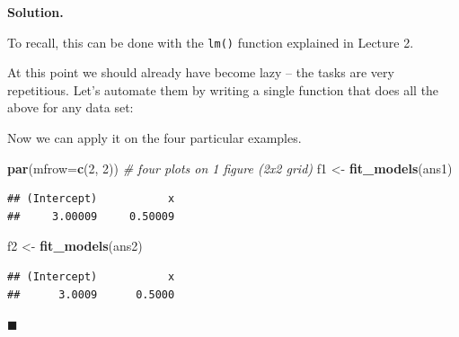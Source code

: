 \documentclass[10pt,b5paper,krantz1]{krantz}
\newenvironment{Shaded}{\begin{snugshade}}{\end{snugshade}}
\newcommand{\CommentTok}[1]{\textcolor[rgb]{0.37,0.37,0.37}{\textit{#1}}}
\newcommand{\ControlFlowTok}[1]{\textcolor[rgb]{0.27,0.27,0.27}{\textbf{#1}}}
\newcommand{\DataTypeTok}[1]{\textcolor[rgb]{0.27,0.27,0.27}{#1}}
\newcommand{\DecValTok}[1]{\textcolor[rgb]{0.06,0.06,0.06}{#1}}
\newcommand{\KeywordTok}[1]{\textcolor[rgb]{0.27,0.27,0.27}{\textbf{#1}}}
\newcommand{\NormalTok}[1]{#1}
\newcommand{\OperatorTok}[1]{\textcolor[rgb]{0.43,0.43,0.43}{\textbf{#1}}}
\newcommand{\StringTok}[1]{\textcolor[rgb]{0.5,0.5,0.5}{#1}}
\newenvironment{solution}{%
\bigskip\noindent\textbf{Solution. }%
\it\ignorespaces%
\ignorespaces%
}{\ignorespaces%
\hfill$\blacksquare$%
}
\begin{document}
\begin{solution}

To recall, this can be done with the \texttt{lm()} function
explained in Lecture 2.

At this point we should already have become lazy -- the tasks are very
repetitious. Let's automate them by writing a single function
that does all the above for any data set:

\begin{Shaded}
\end{Shaded}

Now we can apply it on the four particular examples.

\begin{Shaded}
\begin{Highlighting}[]
\KeywordTok{par}\NormalTok{(}\DataTypeTok{mfrow=}\KeywordTok{c}\NormalTok{(}\DecValTok{2}\NormalTok{, }\DecValTok{2}\NormalTok{)) }\CommentTok{# four plots on 1 figure (2x2 grid)}
\NormalTok{f1 <-}\StringTok{ }\KeywordTok{fit_models}\NormalTok{(ans1)}
\end{Highlighting}
\end{Shaded}

\begin{verbatim}
## (Intercept)           x 
##     3.00009     0.50009
\end{verbatim}

\begin{Shaded}
\begin{Highlighting}[]
\NormalTok{f2 <-}\StringTok{ }\KeywordTok{fit_models}\NormalTok{(ans2)}
\end{Highlighting}
\end{Shaded}

\begin{verbatim}
## (Intercept)           x 
##      3.0009      0.5000
\end{verbatim}


\end{solution}
\end{document}
